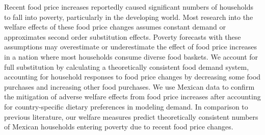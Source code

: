 Recent food price increases reportedly caused significant numbers of households to fall into poverty, particularly in the developing world. Most research into the welfare effects of these food price changes assumes constant demand or approximates second order substitution effects. Poverty forecasts with these assumptions may overestimate or underestimate the effect of food price increases in a nation where most households consume diverse food baskets. We account for full substitution by calculating a theoretically consistent food demand system, accounting for household responses to food price changes by decreasing some food purchases and increasing other food purchases. We use Mexican data to confirm the mitigation of adverse welfare effects from food price increases after accounting for country-specific dietary preferences in modeling demand. In comparison to previous literature, our welfare measures predict theoretically consistent numbers of Mexican households entering poverty due to recent food price changes.